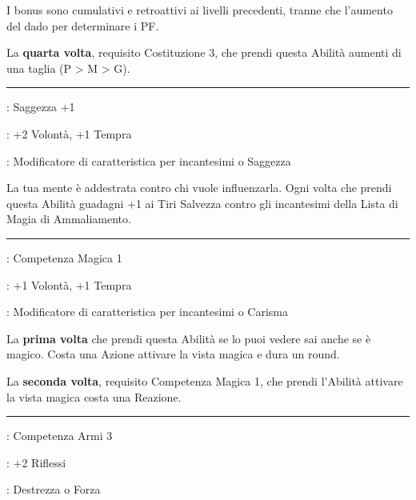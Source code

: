\begin{multicols}{2}
I bonus sono cumulativi e retroattivi ai livelli precedenti, tranne che l'aumento del dado per determinare i PF.

La \textbf{quarta volta}, requisito Costituzione 3, che prendi questa Abilità aumenti di una taglia (P > M > G).

\smallskip\noindent\rule{\linewidth}{2pt} \hypertarget{Muro mentale}{}\medskip{}
\noindent
\begin{description}[noitemsep, topsep=0pt, parsep=0pt, partopsep=0pt, leftmargin=0cm, labelwidth=2.5cm]
    \item[\textbf{Requisito}]: Saggezza +1
    \item[\textbf{Tiri Salvezza}]: +2 Volontà, +1 Tempra
    \item[\textbf{Caratteristica}]: Modificatore di caratteristica per incantesimi o Saggezza
\end{description}

La tua mente è addestrata contro chi vuole influenzarla. Ogni volta che prendi questa Abilità guadagni +1 ai Tiri Salvezza contro gli incantesimi della Lista di Magia di Ammaliamento.

\smallskip\noindent\rule{\linewidth}{2pt} \hypertarget{Occhi della magia}{}\medskip{}
\noindent
\begin{description}[noitemsep, topsep=0pt, parsep=0pt, partopsep=0pt, leftmargin=0cm, labelwidth=2.5cm]
    \item[\textbf{Requisito}]: Competenza Magica 1
    \item[\textbf{Tiri Salvezza}]: +1 Volontà, +1 Tempra
    \item[\textbf{Caratteristica}]: Modificatore di caratteristica per incantesimi o Carisma
\end{description}

La \textbf{prima volta} che prendi questa Abilità se lo puoi vedere sai anche se è magico. Costa una Azione attivare la vista magica e dura un round.

La \textbf{seconda volta}, requisito Competenza Magica 1, che prendi l'Abilità attivare la vista magica costa una Reazione.
\smallskip\noindent\rule{\linewidth}{2pt} \hypertarget{Occhio Clinico}{}\medskip{}
\noindent
\begin{description}[noitemsep, topsep=0pt, parsep=0pt, partopsep=0pt, leftmargin=0cm, labelwidth=2.5cm]
    \item[\textbf{Requisito}]: Competenza Armi 3
    \item[\textbf{Tiri Salvezza}]: +2 Riflessi
    \item[\textbf{Caratteristica}]: Destrezza o Forza
\end{description}


\end{multicols}
